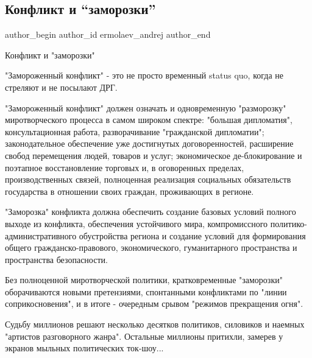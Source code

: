  
 
 
 
 
 
\subsection{Конфликт и \enquote{заморозки}}
\label{sec:19_10_2021.fb.ermolaev_andrej.1.konflikt_i_zamorozki}
 
\ifcmt
 author_begin
   author_id ermolaev_andrej
 author_end
\fi

Конфликт и "заморозки"

"Замороженный конфликт" - это не просто временный status quo, когда не стреляют
и не посылают ДРГ. 

"Замороженный конфликт" должен означать и одновременную "разморозку"
миротворческого процесса в самом широком спектре: "большая дипломатия",
консультационная работа, разворачивание "гражданской дипломатии";
законодательное обеспечение уже достигнутых договоренностей, расширение свобод
перемещения людей, товаров и услуг; экономическое де-блокирование и поэтапное
восстановление торговых и, в оговоренных пределах, производственных связей,
полноценная реализация социальных обязательств государства в отношении своих
граждан, проживающих в регионе. 

"Заморозка" конфликта должна обеспечить создание базовых условий полного выходе
из конфликта, обеспечения устойчивого мира, компромиссного
политико-административного обустройства региона и  создание условий для
формирования общего гражданско-правового, экономического, гуманитарного
пространства и пространства безопасности.

Без полноценной миротворческой политики, кратковременные "заморозки"
оборачиваются новыми претензиями, спонтанными конфликтами по "линии
соприкосновения", и в итоге - очередным срывом "режимов прекращения огня". 

Судьбу миллионов решают несколько десятков политиков, силовиков и наемных
"артистов разговорного жанра".  Остальные миллионы притихли, замерев у экранов
мыльных политических ток-шоу...

